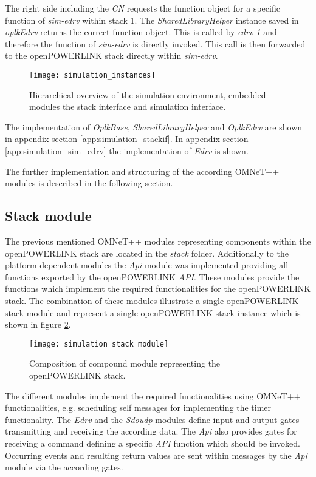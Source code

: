 The right side including the \emph{CN} requests the function object for a specific function of \emph{sim-edrv} within stack 1.
The \emph{SharedLibraryHelper} instance saved in \emph{oplkEdrv} returns the correct function object.
This is called by \emph{edrv 1} and therefore the function of \emph{sim-edrv} is directly invoked.
This call is then forwarded to the openPOWERLINK stack directly within \emph{sim-edrv}.

\begin{figure}
    \centering
    \texttt{[image: simulation\_instances]}
    \caption{Hierarchical overview of the simulation environment, embedded modules the stack interface and simulation interface.}
    \label{fig:simulation_instances}
\end{figure}

The implementation of \emph{OplkBase}, \emph{SharedLibraryHelper} and \emph{OplkEdrv} are shown in appendix section \ref{app:simulation_stackif}.
In appendix section \ref{app:simulation_sim_edrv} the implementation of \emph{Edrv} is shown.

The further implementation and structuring of the according OMNeT++ modules is described in the following section.

\subsection{Stack module}
\label{sec:porting_stack_stackmodule}

The previous mentioned OMNeT++ modules representing components within the openPOWERLINK stack are located in the \emph{stack} folder.
Additionally to the platform dependent modules the \emph{Api} module was implemented providing all functions exported by the openPOWERLINK \emph{API}.
These modules provide the functions which implement the required functionalities for the openPOWERLINK stack.
The combination of these modules illustrate a single openPOWERLINK stack module and represent a single openPOWERLINK stack instance which is shown in figure \ref{fig:simulation_stack_module}.

\begin{figure}
    \centering
    \texttt{[image: simulation\_stack\_module]}
    \caption{Composition of compound module representing the openPOWERLINK stack.}
    \label{fig:simulation_stack_module}
\end{figure}

\begin{sloppypar}
The different modules implement the required functionalities using OMNeT++ functionalities, e.g. scheduling self messages for implementing the timer functionality.
The \emph{Edrv} and the \emph{Sdoudp} modules define input and output gates transmitting and receiving the according data.
The \emph{Api} also provides gates for receiving a command defining a specific \emph{API} function which should be invoked.
Occurring events and resulting return values are sent within messages by the \emph{Api} module via the according gates.
\end{sloppypar}

